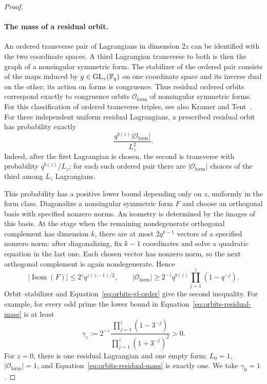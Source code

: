 \begin{proof}
\paragraph{The mass of a residual orbit.}
An ordered transverse pair of Lagrangians in dimension $2z$ can be
identified with the two coordinate spaces.  A third Lagrangian
transverse to both is then the graph of a nonsingular symmetric form.
The stabilizer of the ordered pair consists of the maps induced by
$g\in\operatorname{GL}_z(\mathbb F_q)$ on one coordinate space and its inverse
dual on the other; its action on forms is congruence.  Thus residual
ordered orbits correspond exactly to congruence orbits
$\mathcal O_{\mathrm{form}}$ of nonsingular symmetric forms.
For this classification of ordered transverse triples, see also
Kramer and Tent~\cite[Theorem~6 and Section~2.3]{kramertent2010}.
For three independent uniform residual Lagrangians, a prescribed
residual orbit has probability exactly
\begin{equation}
 \frac{q^{b(z)}|\mathcal O_{\mathrm{form}}|}{L_z^2}.
 \label{eq:orbits-residual-mass}
\end{equation}
Indeed, after the first Lagrangian is chosen, the second is transverse
with probability $q^{b(z)}/L_z$; for each such ordered pair there are
$|\mathcal O_{\mathrm{form}}|$ choices of the third among $L_z$
Lagrangians.

This probability has a positive lower bound depending only on $z$,
uniformly in the form class.  Diagonalize a nonsingular symmetric form $F$
and choose an orthogonal basis with specified nonzero norms.  An
isometry is determined by the images of this basis.  At the stage when
the remaining nondegenerate orthogonal complement has dimension $k$,
there are at most $2q^{k-1}$ vectors of a specified nonzero norm: after
diagonalizing, fix $k-1$ coordinates and solve a quadratic equation in
the last one.  Each chosen vector has nonzero norm, so the next
orthogonal complement is again nondegenerate.  Hence
\begin{equation}
 |\operatorname{Isom}(F)|\le
 2^z q^{z(z-1)/2},\qquad
 |\mathcal O_{\mathrm{form}}|
 \ge 2^{-z}q^{b(z)}\prod_{j=1}^z(1-q^{-j}).
 \label{eq:orbits-isometry-bound}
\end{equation}
Orbit--stabilizer and Equation~\eqref{eq:orbits-gl-order} give the second
inequality.  For example, for every odd prime the lower bound in
Equation~\eqref{eq:orbits-residual-mass} is at least
\begin{equation}
 \gamma_z:=2^{-z}
 \frac{\prod_{j=1}^z(1-3^{-j})}
 {\prod_{j=1}^z(1+3^{-j})^2}>0.
 \label{eq:orbits-residual-constant}
\end{equation}
For $z=0$, there is one residual Lagrangian and one empty form;
$L_0=1$, $|\mathcal O_{\mathrm{form}}|=1$, and
Equation~\eqref{eq:orbits-residual-mass} is exactly one.  We take
$\gamma_0=1$.


\end{proof}
